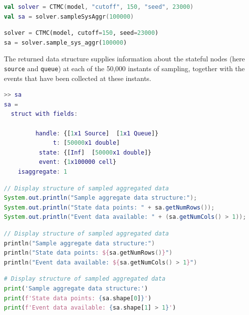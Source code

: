 \begin{KOTLIN}
\begin{lstlisting}[language = kotlin, basicstyle=\ttfamily\scriptsize]
val solver = CTMC(model, "cutoff", 150, "seed", 23000)
val sa = solver.sampleSysAggr(100000)
\end{lstlisting}
\end{KOTLIN}
\begin{PYTHON}
\begin{lstlisting}[language = python]
solver = CTMC(model, cutoff=150, seed=23000)
sa = solver.sample_sys_aggr(100000)
\end{lstlisting}
\end{PYTHON}
The returned data structure supplies information about the stateful nodes (here \texttt{source} and \texttt{queue}) at each of the 50,000 instants of sampling, together with the events that have been collected at these instants.
\begin{MATLAB}
\begin{lstlisting}[language = matlab]
>> sa
sa =
  struct with fields:

         handle: {[1x1 Source]  [1x1 Queue]}
              t: [50000x1 double]
          state: {[Inf]  [50000x1 double]}
          event: {1x100000 cell}
    isaggregate: 1
\end{lstlisting}
\end{MATLAB}
\begin{JAVA}
\begin{lstlisting}[language=java, basicstyle=\ttfamily\scriptsize]
// Display structure of sampled aggregated data
System.out.println("Sample aggregate data structure:");
System.out.println("State data points: " + sa.getNumRows());
System.out.println("Event data available: " + (sa.getNumCols() > 1));
\end{lstlisting}
\end{JAVA}
\begin{KOTLIN}
\begin{lstlisting}[language = kotlin, basicstyle=\ttfamily\scriptsize]
// Display structure of sampled aggregated data
println("Sample aggregate data structure:")
println("State data points: ${sa.getNumRows()}")
println("Event data available: ${sa.getNumCols() > 1}")
\end{lstlisting}
\end{KOTLIN}
\begin{PYTHON}
\begin{lstlisting}[language=python]
# Display structure of sampled aggregated data
print('Sample aggregate data structure:')
print(f'State data points: {sa.shape[0]}')
print(f'Event data available: {sa.shape[1] > 1}')
\end{lstlisting}
\end{PYTHON}
